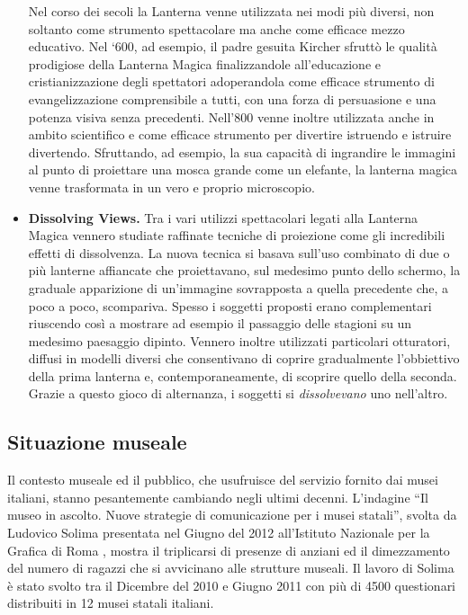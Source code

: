 \begin{itemize}
	Nel corso dei secoli la Lanterna venne utilizzata nei modi più diversi, non soltanto come strumento spettacolare ma anche come efficace mezzo educativo. Nel ‘600, ad esempio, il padre gesuita Kircher sfruttò le qualità prodigiose della Lanterna Magica finalizzandole all’educazione e cristianizzazione degli spettatori adoperandola come efficace strumento di evangelizzazione comprensibile a tutti, con una forza di persuasione e una potenza visiva senza precedenti. Nell’800 venne inoltre utilizzata anche in ambito scientifico e come efficace strumento per divertire istruendo e istruire divertendo. Sfruttando, ad esempio, la sua capacità di ingrandire le immagini al punto di proiettare una mosca grande come un elefante, la lanterna magica venne trasformata in un vero e proprio microscopio.
	
	\item \textbf{Dissolving Views.}
	\label{contesto_dissolving_views}
	Tra i vari utilizzi spettacolari legati alla Lanterna Magica vennero studiate raffinate tecniche di proiezione come gli incredibili effetti di dissolvenza. La nuova tecnica si basava sull’uso combinato di due o più lanterne affiancate che proiettavano, sul medesimo punto dello schermo, la graduale apparizione di un’immagine sovrapposta a quella precedente che, a poco a poco, scompariva. Spesso i soggetti proposti erano complementari riuscendo così a mostrare ad esempio il passaggio delle stagioni su un medesimo paesaggio dipinto. Vennero inoltre utilizzati particolari otturatori, diffusi in modelli diversi che consentivano di coprire gradualmente l’obbiettivo della prima lanterna e, contemporaneamente, di scoprire quello della seconda. Grazie a questo gioco di alternanza, i soggetti si \textit{dissolvevano} uno nell’altro.
	
\end{itemize}

\subsection{Situazione museale}
\label{sec:situazione_museale}

Il contesto museale ed il pubblico, che usufruisce del servizio fornito dai musei italiani, stanno pesantemente cambiando negli ultimi decenni.
L’indagine “Il museo in ascolto. Nuove strategie di comunicazione per i musei statali”, svolta da Ludovico Solima presentata nel Giugno del 2012 all’Istituto Nazionale per la Grafica di Roma \cite{MuseoInAscolto}, mostra il triplicarsi di presenze di anziani ed il dimezzamento del numero di ragazzi che si avvicinano alle strutture museali.
Il lavoro di Solima è stato svolto tra il Dicembre del 2010 e Giugno 2011 con più di 4500 questionari distribuiti in 12 musei statali italiani.

